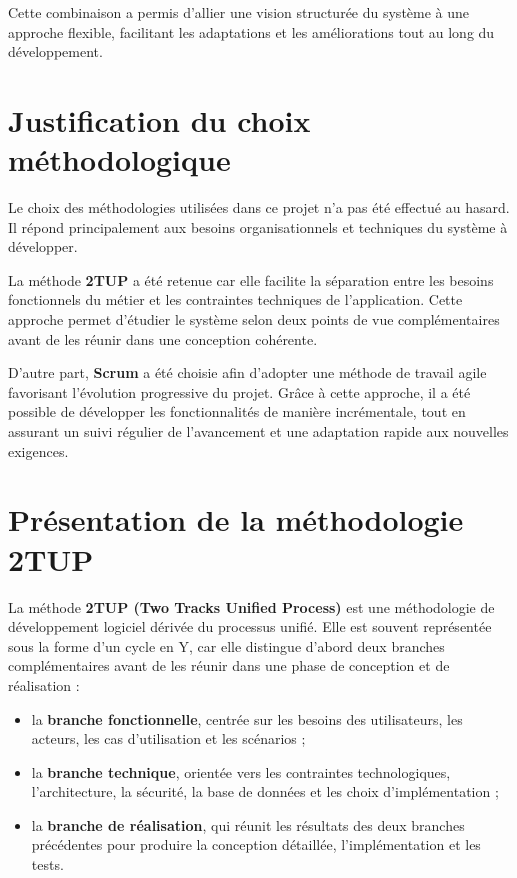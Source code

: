 \documentclass[12pt]{report}
\begin{document}
Cette combinaison a permis d’allier une vision structurée du système à une
approche flexible, facilitant les adaptations et les améliorations tout au long
du développement.

\section{Justification du choix méthodologique}

Le choix des méthodologies utilisées dans ce projet n’a pas été effectué au
hasard. Il répond principalement aux besoins organisationnels et techniques du
système à développer.

La méthode \textbf{2TUP} a été retenue car elle facilite la séparation entre les
besoins fonctionnels du métier et les contraintes techniques de l’application.
Cette approche permet d’étudier le système selon deux points de vue
complémentaires avant de les réunir dans une conception cohérente.

D’autre part, \textbf{Scrum} a été choisie afin d’adopter une méthode de travail
agile favorisant l’évolution progressive du projet. Grâce à cette approche, il a
été possible de développer les fonctionnalités de manière incrémentale, tout en
assurant un suivi régulier de l’avancement et une adaptation rapide aux nouvelles
exigences.

\section{Présentation de la méthodologie 2TUP}

La méthode \textbf{2TUP (Two Tracks Unified Process)} est une méthodologie de
développement logiciel dérivée du processus unifié. Elle est souvent représentée
sous la forme d’un cycle en Y, car elle distingue d’abord deux branches
complémentaires avant de les réunir dans une phase de conception et de
réalisation :

\begin{itemize}
    \item la \textbf{branche fonctionnelle}, centrée sur les besoins des
          utilisateurs, les acteurs, les cas d’utilisation et les scénarios ;
    \item la \textbf{branche technique}, orientée vers les contraintes
          technologiques, l’architecture, la sécurité, la base de données et les
          choix d’implémentation ;
    \item la \textbf{branche de réalisation}, qui réunit les résultats des deux
          branches précédentes pour produire la conception détaillée,
          l’implémentation et les tests.
\end{itemize}
\end{document}
